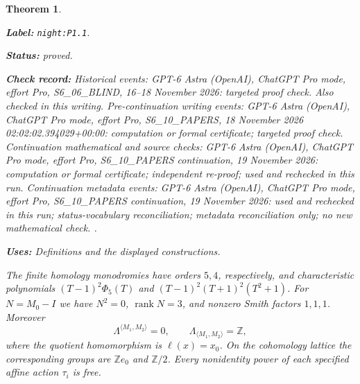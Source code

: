 \documentclass[11pt,a4paper]{article}
\newtheorem{theorem}{Theorem}[section]
\theoremstyle{definition}
\newcommand{\StatementRecord}[4]{\par\smallskip\begingroup\upshape\raggedright\noindent\textbf{Label:} \nolinkurl{#1}.\par\noindent\textbf{Status:} #2.\par\noindent\textbf{Check record:} #3.\par\noindent\textbf{Uses:} #4.\par\endgroup\smallskip}
\begin{document}
\begin{theorem}\label{night:P1.1}
\StatementRecord{night:P1.1}{proved}{Historical events: GPT-6 Astra (OpenAI), ChatGPT Pro mode, effort Pro, S6\_06\_BLIND, 16--18 November 2026: targeted proof check. Also checked in this writing. Pre-continuation writing events: GPT-6 Astra (OpenAI), ChatGPT Pro mode, effort Pro, S6\_10\_PAPERS, 18 November 2026 02:02:02.394029+00:00: computation or formal certificate; targeted proof check. Continuation mathematical and source checks: GPT-6 Astra (OpenAI), ChatGPT Pro mode, effort Pro, S6\_10\_PAPERS continuation, 19 November 2026: computation or formal certificate; independent re-proof; used and rechecked in this run. Continuation metadata events: GPT-6 Astra (OpenAI), ChatGPT Pro mode, effort Pro, S6\_10\_PAPERS continuation, 19 November 2026: used and rechecked in this run; status-vocabulary reconciliation; metadata reconciliation only; no new mathematical check. }{Definitions and the displayed constructions}
The finite homology monodromies have orders $5,4$, respectively, and
characteristic polynomials
$(T-1)^2\Phi _5(T)$ and $(T-1)^2(T+1)^2(T^2+1)$.
For $N=M_0-I$ we have $N^2=0$, $\operatorname{rank}N=3$, and
nonzero Smith factors $1,1,1$.  Moreover
\[
 \Lambda^{\langle M_1,M_2\rangle}=0,\qquad
 \Lambda_{\langle M_1,M_2\rangle}=\mathbb Z,
\]
where the quotient homomorphism is $\ell(x)=x_0$.
On the cohomology lattice the corresponding groups are $\mathbb Ze_0$
and $\mathbb Z/2$.  Every nonidentity power of each specified affine
action $\tau_i$ is free.
\end{theorem}
\end{document}
